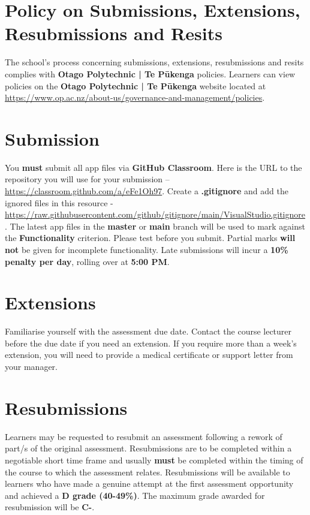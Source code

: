 \documentclass{article}
\begin{document}
\section*{Policy on Submissions, Extensions, Resubmissions and Resits}
The school's process concerning submissions, extensions, resubmissions and resits complies with \textbf{Otago Polytechnic | Te Pūkenga} policies. Learners can view policies on the \textbf{Otago Polytechnic | Te Pūkenga} website located at \href{https://www.op.ac.nz/about-us/governance-and-management/policies}{https://www.op.ac.nz/about-us/governance-and-management/policies}.

\section*{Submission}
You \textbf{must} submit all app files via \textbf{GitHub Classroom}. Here is the URL to the repository you will use for your submission – \href{https://classroom.github.com/a/eFe1Oh97}{https://classroom.github.com/a/eFe1Oh97}.  Create a \textbf{.gitignore} and add the ignored files in this resource - \href{https://raw.githubusercontent.com/github/gitignore/main/VisualStudio.gitignore}{https://raw.githubusercontent.com/github/gitignore/main/VisualStudio.gitignore}. The latest app files in the \textbf{master} or \textbf{main} branch will be used to mark against the \textbf{Functionality} criterion. Please test before you submit. Partial marks \textbf{will not} be given for incomplete functionality. Late submissions will incur a \textbf{10\% penalty per day}, rolling over at \textbf{5:00 PM}.

\section*{Extensions}
Familiarise yourself with the assessment due date. Contact the course lecturer before the due date if you need an extension. If you require more than a week's extension, you will need to provide a medical certificate or support letter from your manager.

\section*{Resubmissions}
Learners may be requested to resubmit an assessment following a rework of part/s of the original assessment. Resubmissions are to be completed within a negotiable short time frame and usually \textbf{must} be completed within the timing of the course to which the assessment relates. Resubmissions will be available to learners who have made a genuine attempt at the first assessment opportunity and achieved a \textbf{D grade (40-49\%)}. The maximum grade awarded for resubmission will be \textbf{C-}.
\end{document}

